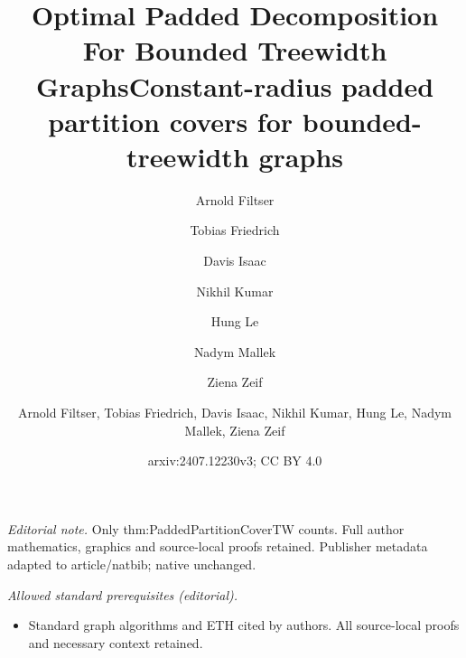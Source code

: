 \documentclass{article}
\author{Arnold Filtser \and Tobias Friedrich \and Davis Isaac \and Nikhil Kumar \and Hung Le \and Nadym Mallek \and Ziena Zeif}\date{}
\title{Optimal Padded Decomposition For Bounded Treewidth Graphs}
\title{Constant-radius padded partition covers for bounded-treewidth graphs}
\author{Arnold Filtser, Tobias Friedrich, Davis Isaac, Nikhil Kumar, Hung Le, Nadym Mallek, Ziena Zeif}
\date{arxiv:2407.12230v3; CC BY 4.0}
\begin{document}
\maketitle
\noindent\textit{Editorial note.} Only thm:PaddedPartitionCoverTW counts. Full author mathematics, graphics and source-local proofs retained. Publisher metadata adapted to article/natbib; native unchanged.\par\medskip
\noindent\textit{Allowed standard prerequisites (editorial).}\begin{itemize}
\item Standard graph algorithms and ETH cited by authors. All source-local proofs and necessary context retained.
\end{itemize}\medskip
\maketitle
\end{document}
